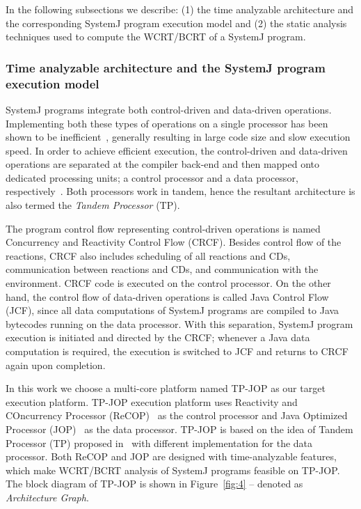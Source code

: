 In the following subsections we describe: (1) the time analyzable
architecture and the corresponding SystemJ program execution model and
(2) the static analysis techniques used to compute the WCRT/BCRT of a
SystemJ program.

\subsubsection{Time analyzable architecture and the SystemJ program
  execution model}
\label{sec:time-analyz-arch}

SystemJ programs integrate both control-driven and data-driven
operations. Implementing both these types of operations on a single
processor has been shown to be
inefficient~\cite{DBLP:journals/tecs/SalcicM13}, generally resulting in
large code size and slow execution speed. In order to achieve efficient
execution, the control-driven and data-driven operations are separated
at the compiler back-end and then mapped onto dedicated processing
units; a control processor and a data processor,
respectively~\cite{DBLP:journals/tecs/SalcicM13}. Both processors work
in tandem, hence the resultant architecture is also termed the
\textit{Tandem Processor} (TP).

The program control flow representing control-driven operations is named
Concurrency and Reactivity Control Flow (CRCF). Besides control flow of
the reactions, CRCF also includes scheduling of all reactions and CDs,
communication between reactions and CDs, and communication with the
environment. CRCF code is executed on the control processor. On the
other hand, the control flow of data-driven operations is called Java
Control Flow (JCF), since all data computations of SystemJ programs are
compiled to Java bytecodes running on the data processor. With this
separation, SystemJ program execution is initiated and directed by the
CRCF; whenever a Java data computation is required, the execution is
switched to JCF and returns to CRCF again upon completion.

In this work we choose a multi-core platform named TP-JOP as our target
execution platform. TP-JOP execution platform uses Reactivity and
COncurrency Processor (ReCOP)~\cite{DBLP:journals/tecs/SalcicM13} as the
control processor and Java Optimized Processor
(JOP)~\cite{jop:jnl:jsa2007} as the data processor. TP-JOP is based on
the idea of Tandem Processor (TP) proposed
in~\cite{DBLP:journals/tecs/SalcicM13} with different implementation for
the data processor. Both ReCOP and JOP are designed with time-analyzable
features, which make WCRT/BCRT analysis of SystemJ programs feasible on
TP-JOP. The block diagram of TP-JOP is shown in Figure~\ref{fig:4} --
denoted as \textit{Architecture
  Graph}. %

